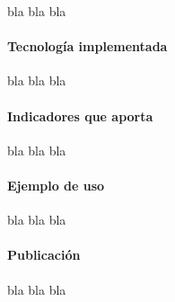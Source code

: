 bla bla bla

\paragraph*{Tecnología implementada}

bla bla bla

\paragraph*{Indicadores que aporta}

bla bla bla

\paragraph*{Ejemplo de uso}

bla bla bla

\paragraph*{Publicación}

bla bla bla





 











